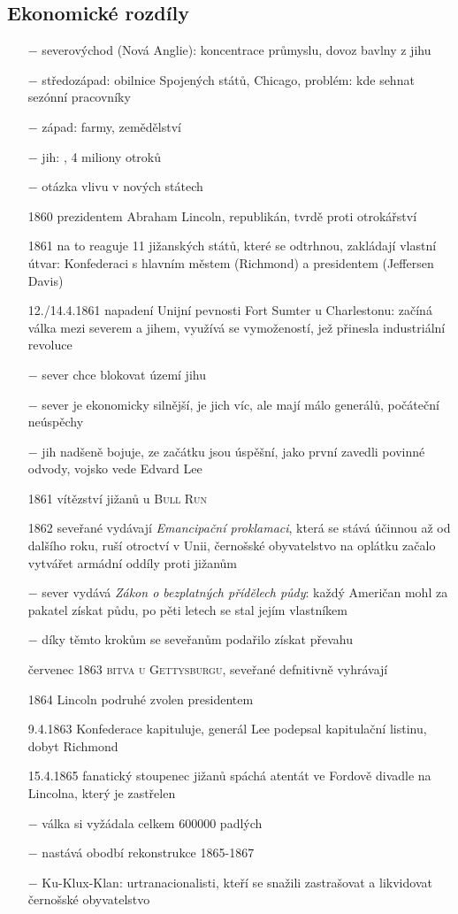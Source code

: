 \documentclass{article}
\begin{document}
\subsection*{Ekonomické rozdíly}
\begin{itemize}
    \vspace{-0.5em}
    \setlength\itemsep{0.15em}
    \item[$-$] severovýchod (Nová Anglie): koncentrace průmyslu, dovoz bavlny z jihu
    \item[$-$] středozápad: obilnice Spojených států, Chicago, problém: kde sehnat sezónní pracovníky
    \item[$-$] západ: farmy, zemědělství
    \item[$-$] jih: , 4 miliony otroků
    \item[$-$] otázka vlivu v nových státech
    \item[1860] prezidentem Abraham Lincoln, republikán, tvrdě proti otrokářství
    \item[1861] na to reaguje 11 jižanských států, které se odtrhnou, zakládají vlastní útvar: Konfederaci s hlavním městem (Richmond) a presidentem (Jeffersen Davis)
    \item[12./14.4.1861] napadení Unijní pevnosti Fort Sumter u Charlestonu: začíná válka mezi severem a jihem, využívá se vymožeností, jež přinesla industriální revoluce
    \item[$-$] sever chce blokovat území jihu
    \item[$-$] sever je ekonomicky silnější, je jich víc, ale mají málo generálů, počáteční neúspěchy
    \item[$-$] jih nadšeně bojuje, ze začátku jsou úspěšní, jako první zavedli povinné odvody, vojsko vede Edvard Lee
    \item[1861] vítězství jižanů u \textsc{Bull Run}
    \item[1862] seveřané vydávají \textit{Emancipační proklamaci}, která se stává účinnou až od dalšího roku, ruší otroctví v Unii, černošské obyvatelstvo na oplátku začalo vytvářet armádní oddíly proti jižanům
    \item[$-$] sever vydává \textit{Zákon o bezplatných přídělech půdy}: každý Američan mohl za pakatel získat půdu, po pěti letech se stal jejím vlastníkem
    \item[$-$] díky těmto krokům se seveřanům podařilo získat převahu
    \item[červenec 1863] \textsc{bitva u Gettysburgu}, seveřané defnitivně vyhrávají
    \item[1864] Lincoln podruhé zvolen presidentem
    \item[9.4.1863] Konfederace kapituluje, generál Lee podepsal kapitulační listinu, dobyt Richmond
    \item[15.4.1865] fanatický stoupenec jižanů spáchá atentát ve Fordově divadle na Lincolna, který je zastřelen
    \item[$-$] válka si vyžádala celkem 600000 padlých
    \item[$-$] nastává obodbí rekonstrukce 1865-1867
    \item[$-$] Ku-Klux-Klan: urtranacionalisti, kteří se snažili zastrašovat a likvidovat černošské obyvatelstvo
\end{itemize}
\end{document}
